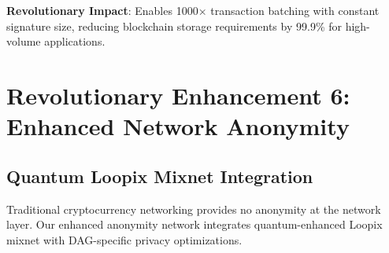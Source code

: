 \documentclass[12pt,a4paper]{article}
\begin{document}
\textbf{Revolutionary Impact}: Enables 1000× transaction batching with constant signature size, reducing blockchain storage requirements by 99.9\% for high-volume applications.

\section{Revolutionary Enhancement 6: Enhanced Network Anonymity}

\subsection{Quantum Loopix Mixnet Integration}

Traditional cryptocurrency networking provides no anonymity at the network layer. Our enhanced anonymity network integrates quantum-enhanced Loopix mixnet with DAG-specific privacy optimizations.
\end{document}
